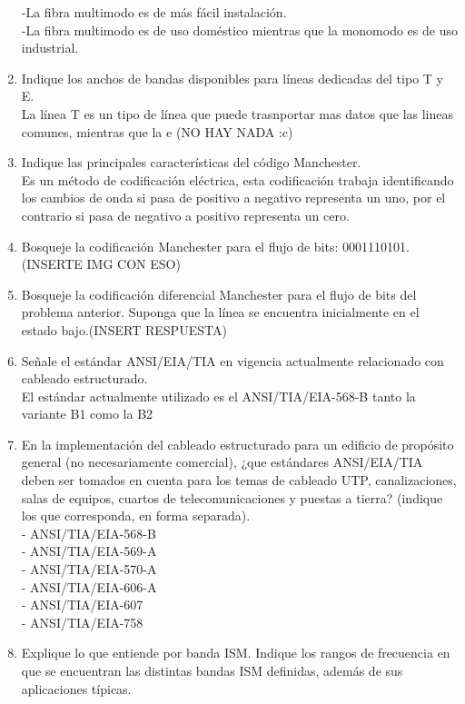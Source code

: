 \documentclass{udparticle}
\begin{document}
\begin{enumerate}
-La fibra multimodo es de más fácil instalación.\\
-La fibra multimodo es de uso doméstico mientras que la monomodo es de uso industrial.\\
\item Indique los anchos de bandas disponibles para líneas dedicadas del tipo T y E.\\
La línea T es un tipo de línea que puede trasnportar mas datos que las lineas comunes, mientras que la e (NO HAY NADA :c)\\
\item  Indique las principales características del código Manchester.\\
Es un método de codificación eléctrica, esta codificación trabaja identificando los cambios de onda si pasa de positivo a negativo representa un uno, por el contrario si pasa de negativo a positivo representa un cero.\\
\item Bosqueje la codificación Manchester para el ﬂujo de bits: 0001110101.(INSERTE IMG CON ESO)\\
\item  Bosqueje la codificación diferencial Manchester para el ﬂujo de bits del problema anterior. Suponga que la línea se encuentra inicialmente en el estado bajo.(INSERT RESPUESTA)\\
\item Señale el estándar ANSI/EIA/TIA en vigencia actualmente relacionado con cableado estructurado.\\
El estándar actualmente utilizado es el ANSI/TIA/EIA-568-B tanto la variante B1 como la B2\\
\item En la implementación del cableado estructurado para un edificio de propósito general (no necesariamente comercial), ¿que estándares ANSI/EIA/TIA deben ser tomados en cuenta para los temas de cableado UTP, canalizaciones, salas de equipos, cuartos de telecomunicaciones y puestas a tierra? (indique los que corresponda, en forma separada).\\
- ANSI/TIA/EIA-568-B\\
- ANSI/TIA/EIA-569-A\\
- ANSI/TIA/EIA-570-A\\
- ANSI/TIA/EIA-606-A\\
- ANSI/TIA/EIA-607\\
- ANSI/TIA/EIA-758\\
\item Explique lo que entiende por banda ISM. Indique los rangos de frecuencia en que se encuentran las distintas bandas ISM definidas, además de sus aplicaciones típicas.\\

\end{enumerate}
\end{document}
